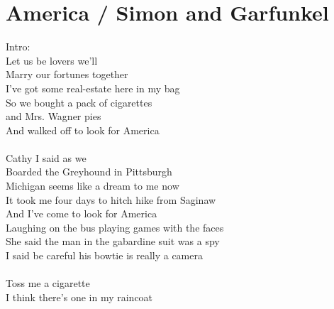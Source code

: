 \section{America / Simon and Garfunkel}\label{sec:america}

  \Cmajor
  \CmajorSeven
  \Aminor
  \Gmajor
  \Fmajor
  \FsusFour
  \Aminor
  \EminorSeven
  \Aseven
  \DmajorEasy
  \FmajorSeven
  
  
Intro:       \\
 Let us be  lovers we'll\\
 Marry our  fortunes together  \\
 I've got some  real-estate  here in my bag\\
 So we bought a pack of  cigarettes\\
 and Mrs. Wagner  pies\\
And  walked  off to  look for America \\
  \\
 Cathy I  said as we\\
 Boarded the  Greyhound in  Pittsburgh  \\
 Michigan  seems like a  dream to me now\\
 It took me four days to hitch hike from Saginaw\\
And  I've  come to  look for America\\
 Laughing on the bus playing  games with the faces\\
 She said the man in the gabardine suit was a  spy\\
 I said be careful his bowtie is really a  camera  \\
  \\
 Toss me a  cigarette\\
 I think there's  one in my  raincoat  \\
